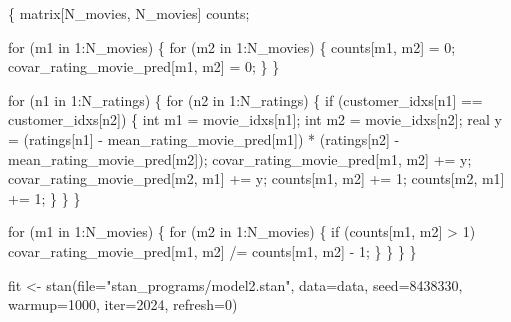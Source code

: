 \documentclass[
  letterpaper,
  DIV=11,
  numbers=noendperiod]{scrartcl}
\newenvironment{Shaded}{\begin{snugshade}}{\end{snugshade}}
\newcommand{\AttributeTok}[1]{\textcolor[rgb]{0.40,0.45,0.13}{#1}}
\newcommand{\ControlFlowTok}[1]{\textcolor[rgb]{0.00,0.23,0.31}{#1}}
\newcommand{\DataTypeTok}[1]{\textcolor[rgb]{0.68,0.00,0.00}{#1}}
\newcommand{\DecValTok}[1]{\textcolor[rgb]{0.68,0.00,0.00}{#1}}
\newcommand{\FunctionTok}[1]{\textcolor[rgb]{0.28,0.35,0.67}{#1}}
\newcommand{\NormalTok}[1]{\textcolor[rgb]{0.00,0.23,0.31}{#1}}
\newcommand{\OtherTok}[1]{\textcolor[rgb]{0.00,0.23,0.31}{#1}}
\newcommand{\StringTok}[1]{\textcolor[rgb]{0.13,0.47,0.30}{#1}}
\begin{document}
\begin{codelisting}
\begin{Shaded}
\begin{Highlighting}[]
\NormalTok{  \{}
    \DataTypeTok{matrix}\NormalTok{[N\_movies, N\_movies] counts;}

    \ControlFlowTok{for}\NormalTok{ (m1 }\ControlFlowTok{in} \DecValTok{1}\NormalTok{:N\_movies) \{}
      \ControlFlowTok{for}\NormalTok{ (m2 }\ControlFlowTok{in} \DecValTok{1}\NormalTok{:N\_movies) \{}
\NormalTok{        counts[m1, m2] = }\DecValTok{0}\NormalTok{;}
\NormalTok{        covar\_rating\_movie\_pred[m1, m2] = }\DecValTok{0}\NormalTok{;}
\NormalTok{      \}}
\NormalTok{    \}}

    \ControlFlowTok{for}\NormalTok{ (n1 }\ControlFlowTok{in} \DecValTok{1}\NormalTok{:N\_ratings) \{}
      \ControlFlowTok{for}\NormalTok{ (n2 }\ControlFlowTok{in} \DecValTok{1}\NormalTok{:N\_ratings) \{}
        \ControlFlowTok{if}\NormalTok{ (customer\_idxs[n1] == customer\_idxs[n2]) \{}
          \DataTypeTok{int}\NormalTok{ m1 = movie\_idxs[n1];}
          \DataTypeTok{int}\NormalTok{ m2 = movie\_idxs[n2];}
          \DataTypeTok{real}\NormalTok{ y =   (ratings[n1] {-} mean\_rating\_movie\_pred[m1])}
\NormalTok{                   * (ratings[n2] {-} mean\_rating\_movie\_pred[m2]);}
\NormalTok{          covar\_rating\_movie\_pred[m1, m2] += y;}
\NormalTok{          covar\_rating\_movie\_pred[m2, m1] += y;}
\NormalTok{          counts[m1, m2] += }\DecValTok{1}\NormalTok{;}
\NormalTok{          counts[m2, m1] += }\DecValTok{1}\NormalTok{;}
\NormalTok{        \}}
\NormalTok{      \}}
\NormalTok{    \}}

    \ControlFlowTok{for}\NormalTok{ (m1 }\ControlFlowTok{in} \DecValTok{1}\NormalTok{:N\_movies) \{}
      \ControlFlowTok{for}\NormalTok{ (m2 }\ControlFlowTok{in} \DecValTok{1}\NormalTok{:N\_movies) \{}
        \ControlFlowTok{if}\NormalTok{ (counts[m1, m2] \textgreater{} }\DecValTok{1}\NormalTok{)}
\NormalTok{          covar\_rating\_movie\_pred[m1, m2] /= counts[m1, m2] {-} }\DecValTok{1}\NormalTok{;}
\NormalTok{      \}}
\NormalTok{    \}}
\NormalTok{  \}}
\NormalTok{\}}
\end{Highlighting}
\end{Shaded}

\end{codelisting}

\begin{Shaded}
\begin{Highlighting}[]
\NormalTok{fit }\OtherTok{\textless{}{-}} \FunctionTok{stan}\NormalTok{(}\AttributeTok{file=}\StringTok{"stan\_programs/model2.stan"}\NormalTok{,}
            \AttributeTok{data=}\NormalTok{data, }\AttributeTok{seed=}\DecValTok{8438330}\NormalTok{,}
            \AttributeTok{warmup=}\DecValTok{1000}\NormalTok{, }\AttributeTok{iter=}\DecValTok{2024}\NormalTok{, }\AttributeTok{refresh=}\DecValTok{0}\NormalTok{)}
\end{Highlighting}
\end{Shaded}
\end{document}
